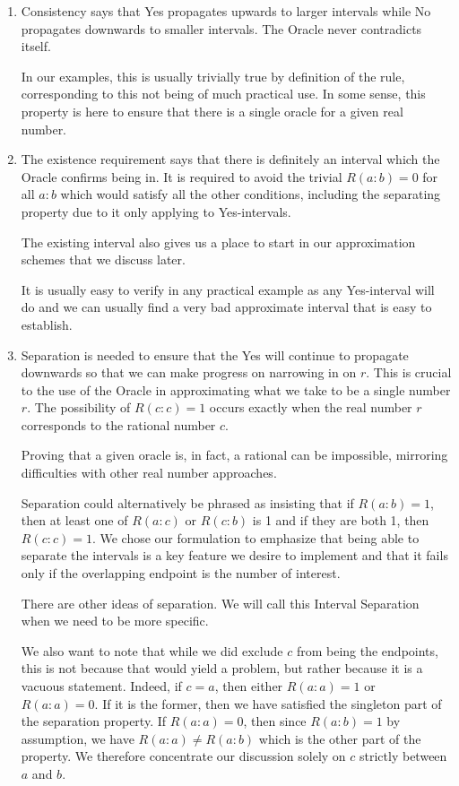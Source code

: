 \documentclass[12pt]{article}
\theoremstyle{remark}
\begin{document}
\begin{enumerate}

    \item Consistency says that Yes propagates upwards to larger intervals while No propagates downwards to smaller intervals. The Oracle never contradicts itself. 
    
    In our examples, this is usually trivially true by definition of the rule, corresponding to this not being of much practical use. In some sense, this property is here to ensure that there is a single oracle for a given real number.  

    \item The existence requirement says that there is definitely an interval which the Oracle confirms being in. It is required to avoid the trivial $R(a:b) = 0$ for all $a:b$ which would satisfy all the other conditions, including the separating property due to it only applying to Yes-intervals. 
    
    The existing interval also gives us a place to start in our approximation schemes that we discuss later. 
    
    It is usually easy to verify in any practical example as any Yes-interval will do and we can usually find a very bad approximate interval that is easy to establish.  

    \item Separation is needed to ensure that the Yes will continue to propagate downwards so that we can make progress on narrowing in on $r$. This is crucial to the use of the Oracle in approximating what we take to be a single number $r$. The possibility of $R(c:c) = 1$ occurs exactly when the real number $r$ corresponds to the rational number $c$. 
    
    Proving that a given oracle is, in fact, a rational can be impossible, mirroring difficulties with other real number approaches. 

    Separation could alternatively be phrased as insisting that if $R(a:b) = 1$, then at least one of $R(a:c)$ or $R(c:b)$ is 1 and if they are both 1, then $R(c:c) = 1$. We chose our formulation to emphasize that being able to separate the intervals is a key feature we desire to implement and that it fails only if the overlapping endpoint is the number of interest. 

    There are other ideas of separation. We will call this Interval Separation when we need to be more specific. 

    We also want to note that while we did exclude $c$ from being the endpoints, this is not because that would yield a problem, but rather because it is a vacuous statement. Indeed, if $c=a$, then either $R(a:a)=1$ or $R(a:a)=0$. If it is the former, then we have satisfied the singleton part of the separation property. If $R(a:a)=0$, then since $R(a:b)=1$ by assumption, we have $R(a:a) \neq R(a:b)$ which is the other part of the property. We therefore concentrate our discussion solely on $c$ strictly between $a$ and $b$.
    

\end{enumerate}
\end{document}
